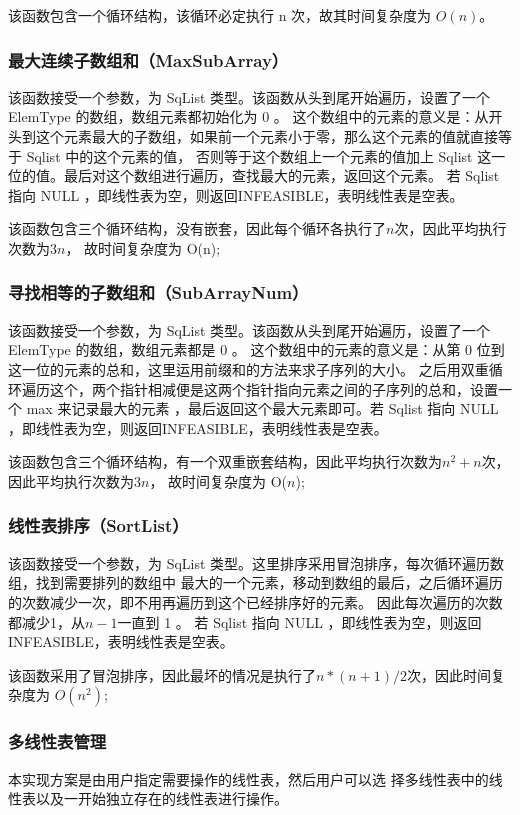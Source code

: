 \documentclass[supercite]{Experimental_Report}
\theoremstyle{definition}
\begin{document}
该函数包含一个循环结构，该循环必定执行 n 次，故其时间复杂度为 $O(n)$。
\subsubsection{最大连续子数组和（MaxSubArray）}
该函数接受一个参数，为 SqList 类型。该函数从头到尾开始遍历，设置了一个 ElemType 的数组，数组元素都初始化为 0 。
这个数组中的元素的意义是：从开头到这个元素最大的子数组，如果前一个元素小于零，那么这个元素的值就直接等于 Sqlist 中的这个元素的值，
否则等于这个数组上一个元素的值加上 Sqlist 这一位的值。最后对这个数组进行遍历，查找最大的元素，返回这个元素。
若 Sqlist 指向 NULL ，即线性表为空，则返回INFEASIBLE，表明线性表是空表。

该函数包含三个循环结构，没有嵌套，因此每个循环各执行了$n$次，因此平均执行次数为$3n$，
故时间复杂度为 O(n);
\subsubsection{寻找相等的子数组和（SubArrayNum）}
该函数接受一个参数，为 SqList 类型。该函数从头到尾开始遍历，设置了一个 ElemType 的数组，数组元素都是 0 。
这个数组中的元素的意义是：从第 0 位到这一位的元素的总和，这里运用前缀和的方法来求子序列的大小。
之后用双重循环遍历这个，两个指针相减便是这两个指针指向元素之间的子序列的总和，设置一个 max 来记录最大的元素
，最后返回这个最大元素即可。若 Sqlist 指向 NULL ，即线性表为空，则返回INFEASIBLE，表明线性表是空表。

该函数包含三个循环结构，有一个双重嵌套结构，因此平均执行次数为$n^2+n$次，因此平均执行次数为$3n$，
故时间复杂度为 O($n$);
\subsubsection{线性表排序（SortList）}
该函数接受一个参数，为 SqList 类型。这里排序采用冒泡排序，每次循环遍历数组，找到需要排列的数组中
最大的一个元素，移动到数组的最后，之后循环遍历的次数减少一次，即不用再遍历到这个已经排序好的元素。
因此每次遍历的次数都减少1，从$n-1$一直到 1 。
若 Sqlist 指向 NULL ，即线性表为空，则返回INFEASIBLE，表明线性表是空表。

该函数采用了冒泡排序，因此最坏的情况是执行了$n*(n+1)/2$次，因此时间复杂度为 $O(n^2)$;
\subsubsection{多线性表管理}
本实现方案是由用户指定需要操作的线性表，然后用户可以选
择多线性表中的线性表以及一开始独立存在的线性表进行操作。
\end{document}

